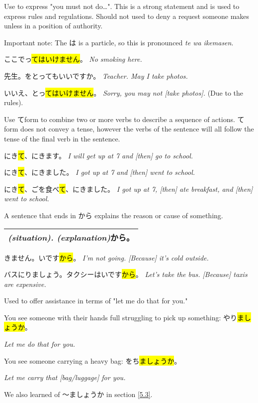     {
    Use to express "you must not do\dots". This is a strong statement and is used to express rules and regulations. Should not used to deny a request someone makes unless in a position of authority.
    
    Important note: The は is a particle, so this is pronounced \textit{te wa ikemasen}.
    
    ここでっ\hl{てはいけません}。
    \textit{No smoking here.}
    
    \sectionSplit
     
    先生。をとってもいいですか。
    \textit{Teacher. May I take photos.}
    
    いいえ、とっ\hl{てはいけません}。
    \textit{Sorry, you may not [take photos].} (Due to the rules).
    }

    {
    Use てform to combine two or more verbs to describe a sequence of actions. てform does not convey a tense, however the verbs of the sentence will all follow the tense of the final verb in the sentence.
    
    にき\hl{て}、にきます。
    \textit{I will get up at 7 and [then] go to school.}
    
    にき\hl{て}、にきました。
    \textit{I got up at 7 and [then] went to school.}
    
    にき\hl{て}、ごを食べ\hl{て}、にきました。
    \textit{I got up at 7, [then] ate breakfast, and [then] went to school.}
    }

    {
    A sentence that ends in から explains the reason or cause of something.
    
    \begin{tabular}{|c|}
        \hline
        \textit{(situation). (explanation)}から。\\
        \hline
    \end{tabular}
    
    きません。いです\hl{から}。
    \textit{I'm not going. [Because] it's cold outside.}
    
    バスにりましょう。タクシーはいです\hl{から}。
    \textit{Let's take the bus. [Because] taxis are expensive.}
    }

    {
    Used to offer assistance in terms of "let me do that for you."
    
    You see someone with their hands full struggling to pick up something: 
    やり\hl{ましょうか}。
    
    \textit{Let me do that for you.}
    
    \sectionSplit
    
    You see someone carrying a heavy bag: をち\hl{ましょうか}。
    
    \textit{Let me carry that [bag/luggage] for you.}
    
    We also learned of 〜ましょうか in section \ref{5.3}.
    }